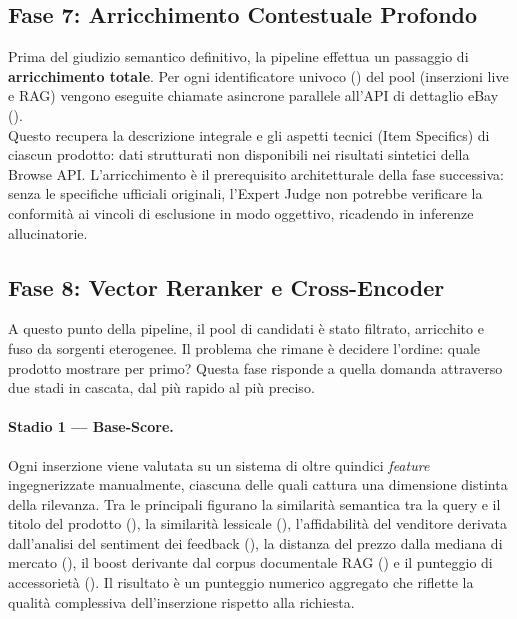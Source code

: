 \subsection*{Fase 7: Arricchimento Contestuale Profondo}
Prima del giudizio semantico definitivo, la pipeline effettua un passaggio
di \textbf{arricchimento totale}. Per ogni identificatore univoco
() del pool (inserzioni live e RAG) vengono eseguite
chiamate asincrone parallele all'API di dettaglio eBay ().\\

\noindent
Questo recupera la descrizione integrale e gli aspetti tecnici (Item Specifics) di ciascun prodotto: dati strutturati non
disponibili nei risultati sintetici della Browse API. L'arricchimento è il
prerequisito architetturale della fase successiva: senza le specifiche
ufficiali originali, l'Expert Judge non potrebbe verificare la conformità
ai vincoli di esclusione in modo oggettivo, ricadendo in inferenze
allucinatorie.

\subsection*{Fase 8: Vector Reranker e Cross-Encoder}
A questo punto della pipeline, il pool di candidati è stato filtrato,
arricchito e fuso da sorgenti eterogenee. Il problema che rimane è
decidere l'ordine: quale prodotto mostrare per primo? Questa fase
risponde a quella domanda attraverso due stadi in cascata, dal più
rapido al più preciso.

\paragraph{Stadio 1 — Base-Score.}
Ogni inserzione viene valutata su un sistema di oltre quindici
\textit{feature} ingegnerizzate manualmente, ciascuna delle quali
cattura una dimensione distinta della rilevanza. Tra le principali
figurano la similarità semantica tra la query e il titolo del prodotto
(), la similarità lessicale (),
l'affidabilità del venditore derivata dall'analisi del sentiment dei
feedback (), la distanza del prezzo dalla mediana
di mercato (), il boost derivante dal corpus documentale
RAG () e il punteggio di accessorietà
(). Il risultato è un punteggio numerico
aggregato che riflette la qualità complessiva dell'inserzione rispetto
alla richiesta.

